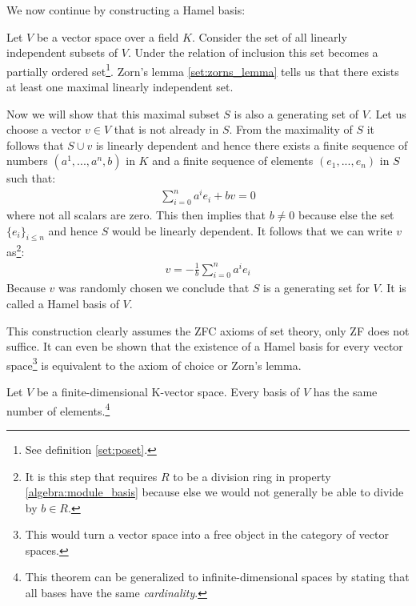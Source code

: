 	We now continue by constructing a Hamel basis:
	\begin{construct}\label{linalgebra:hamel_basis}
		Let $V$ be a vector space over a field $K$. Consider the set of all linearly independent subsets of $V$. Under the relation of inclusion this set becomes a partially ordered set\footnote{See definition \ref{set:poset}.}. Zorn's lemma \ref{set:zorns_lemma} tells us that there exists at least one maximal linearly independent set.
		
		Now we will show that this maximal subset $S$ is also a generating set of $V$. Let us choose a vector $v\in V$ that is not already in $S$. From the maximality of $S$ it follows that $S\cup v$ is linearly dependent and hence there exists a finite sequence of numbers $(a^1, ..., a^n, b)$ in $K$ and a finite sequence of elements $(e_1, ..., e_n)$ in $S$ such that:
		\begin{gather}
			\sum_{i=0}^n a^ie_i + bv = 0
		\end{gather}
		where not all scalars are zero. This then implies that $b\neq0$ because else the set $\{e_i\}_{i\leq n}$ and hence $S$ would be linearly dependent. It follows that we can write $v$ as\footnote{It is this step that requires $R$ to be a division ring in property \ref{algebra:module_basis} because else we would not generally be able to divide by $b\in R$.}:
		\begin{gather}
			v = -\frac{1}{b}\sum_{i=0}^na^ie_i
		\end{gather}
		Because $v$ was randomly chosen we conclude that $S$ is a generating set for $V$. It is called a Hamel basis of $V$.
	\end{construct}
	\begin{remark}
		This construction clearly assumes the ZFC axioms of set theory, only ZF does not suffice. It can even be shown that the existence of a Hamel basis for every vector space\footnote{This would turn a vector space into a free object in the category of vector spaces.} is equivalent to the axiom of choice or Zorn's lemma.
	\end{remark}

        \begin{property}
		Let $V$ be a finite-dimensional K-vector space. Every basis of $V$ has the same number of elements.\footnote{This theorem can be generalized to infinite-dimensional spaces by stating that all bases have the same \textit{cardinality}.}
	\end{property}

